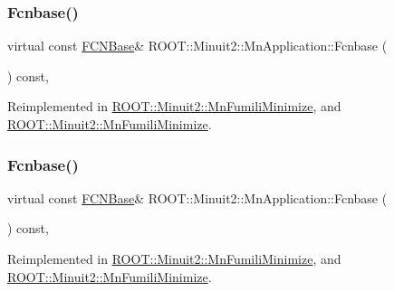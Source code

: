 \subsubsection{\texorpdfstring{Fcnbase()}{Fcnbase()}\hspace{0.1cm}{\footnotesize\ttfamily [1/2]}}
{\footnotesize\ttfamily virtual const \mbox{\hyperlink{classROOT_1_1Minuit2_1_1FCNBase}{F\+C\+N\+Base}}\& R\+O\+O\+T\+::\+Minuit2\+::\+Mn\+Application\+::\+Fcnbase (\begin{DoxyParamCaption}{ }\end{DoxyParamCaption}) const\hspace{0.3cm}{\ttfamily [inline]}, {\ttfamily [virtual]}}



Reimplemented in \mbox{\hyperlink{classROOT_1_1Minuit2_1_1MnFumiliMinimize_a4540fd0311c15810965864988d4c70d1}{R\+O\+O\+T\+::\+Minuit2\+::\+Mn\+Fumili\+Minimize}}, and \mbox{\hyperlink{classROOT_1_1Minuit2_1_1MnFumiliMinimize_a4540fd0311c15810965864988d4c70d1}{R\+O\+O\+T\+::\+Minuit2\+::\+Mn\+Fumili\+Minimize}}.

\mbox{\label{classROOT_1_1Minuit2_1_1MnApplication_af4eb3fe4927d3a8e0efcd5c6b7100881}} 
\subsubsection{\texorpdfstring{Fcnbase()}{Fcnbase()}\hspace{0.1cm}{\footnotesize\ttfamily [2/2]}}
{\footnotesize\ttfamily virtual const \mbox{\hyperlink{classROOT_1_1Minuit2_1_1FCNBase}{F\+C\+N\+Base}}\& R\+O\+O\+T\+::\+Minuit2\+::\+Mn\+Application\+::\+Fcnbase (\begin{DoxyParamCaption}{ }\end{DoxyParamCaption}) const\hspace{0.3cm}{\ttfamily [inline]}, {\ttfamily [virtual]}}



Reimplemented in \mbox{\hyperlink{classROOT_1_1Minuit2_1_1MnFumiliMinimize_a4540fd0311c15810965864988d4c70d1}{R\+O\+O\+T\+::\+Minuit2\+::\+Mn\+Fumili\+Minimize}}, and \mbox{\hyperlink{classROOT_1_1Minuit2_1_1MnFumiliMinimize_a4540fd0311c15810965864988d4c70d1}{R\+O\+O\+T\+::\+Minuit2\+::\+Mn\+Fumili\+Minimize}}.

